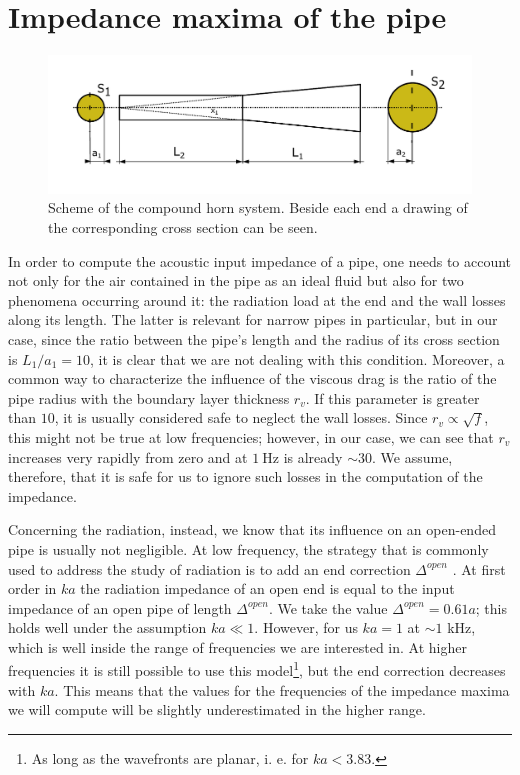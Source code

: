 \documentclass[a4paper]{article}
\begin{document}
\section{Impedance maxima of the pipe}

\begin{figure}[h!]
	\centering
	\includegraphics[width=0.8\linewidth]{diagramma.pdf}
	\caption{Scheme of the compound horn system. Beside each end a drawing of the corresponding cross section can be seen.}
	\label{fig:diag}
\end{figure}

In order to compute the acoustic input impedance of a pipe, one needs to account not only for the air contained in the pipe as an ideal fluid but also for two phenomena occurring around it: the radiation load at the end and the wall losses along its length. The latter is relevant for narrow pipes in particular, but in our case, since the ratio between the pipe's length and the radius of its cross section is $L_1/a_1 = 10$, it is clear that we are not dealing with this condition. Moreover, a common way to characterize the influence of the viscous drag is the ratio of the pipe radius with the boundary layer thickness $r_v$. If this parameter is greater than $10$, it is usually considered safe to neglect the wall losses. Since $r_v \propto \sqrt{f} $, this might not be true at low frequencies; however, in our case, we can see that $r_v$ increases very rapidly from zero and at $\SI{1}{\hertz}$ is already $ \sim 30 $. We assume, therefore, that it is safe for us to ignore such losses in the computation of the impedance. 

Concerning the radiation, instead, we know that its influence on an open-ended pipe is usually not negligible. At low frequency, the strategy that is commonly used to address the study of radiation is to add an end correction $\Delta^{open}$ . At first order in $ka$ the radiation impedance of an open end is equal to the input impedance of an open pipe of length $\Delta^{open}$. We take the value $\Delta^{open} = 0.61 a$; this holds well under the assumption $ka \ll 1 $. However, for us $ka = 1$ at $\sim 1$ kHz, which is well inside the range of frequencies we are interested in. At higher frequencies it is still possible to use this model\footnote{As long as the wavefronts are planar, i. e. for $ka<3.83$.}, but the end correction decreases with $ka$. This means that the values for the frequencies of the impedance maxima we will compute will be slightly underestimated in the higher range.
\end{document}
